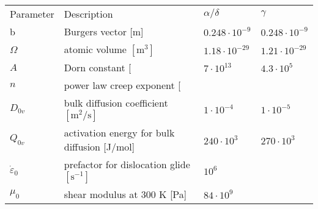 \documentclass[letterpaper,10pt,english]{jupyterBook}
\begin{document}
	
	\begin{savenotes}\sphinxattablestart
		\sphinxthistablewithglobalstyle
		\centering
		\begin{tabulary}{\linewidth}[t]{TTTT}
			\sphinxtoprule
			\sphinxstyletheadfamily 
			\sphinxAtStartPar
			Parameter
			&\sphinxstyletheadfamily 
			\sphinxAtStartPar
			Description
			&\sphinxstyletheadfamily 
			\sphinxAtStartPar
			\(\alpha/\delta\)
			&\sphinxstyletheadfamily 
			\sphinxAtStartPar
			\(\gamma\)
			\\
			\sphinxmidrule
			\sphinxtableatstartofbodyhook
			\sphinxAtStartPar
			b
			&
			\sphinxAtStartPar
			Burgers vector {[}m{]}
			&
			\sphinxAtStartPar
			\(0.248\cdot 10^{-9}\)
			&
			\sphinxAtStartPar
			\(0.248\cdot 10^{-9}\)
			\\
			\sphinxhline
			\sphinxAtStartPar
			\(\Omega\)
			&
			\sphinxAtStartPar
			atomic volume \(\left[\mathrm{m}^3\right]\)
			&
			\sphinxAtStartPar
			\(1.18\cdot 10^{-29}\)
			&
			\sphinxAtStartPar
			\(1.21\cdot 10^{-29}\)
			\\
			\sphinxhline
			\sphinxAtStartPar
			\(A\)
			&
			\sphinxAtStartPar
			Dorn constant {[}\sphinxhyphen{}{]}
			&
			\sphinxAtStartPar
			\(7 \cdot 10^{13}\)
			&
			\sphinxAtStartPar
			\(4.3\cdot 10^{5}\)
			\\
			\sphinxhline
			\sphinxAtStartPar
			\(n\)
			&
			\sphinxAtStartPar
			power law creep exponent {[}\sphinxhyphen{}{]}
			&
			&
			\\
			\sphinxhline
			\sphinxAtStartPar
			\(D_{0v}\)
			&
			\sphinxAtStartPar
			bulk diffusion coefficient \(\left[\mathrm{m}^2/\mathrm{s}\right]\)
			&
			\sphinxAtStartPar
			\(1 \cdot 10^{-4}\)
			&
			\sphinxAtStartPar
			\(1 \cdot 10^{-5}\)
			\\
			\sphinxhline
			\sphinxAtStartPar
			\(Q_{0v}\)
			&
			\sphinxAtStartPar
			activation energy for bulk diffusion {[}J/mol{]}
			&
			\sphinxAtStartPar
			\(240 \cdot 10^{3}\)
			&
			\sphinxAtStartPar
			\(270 \cdot 10^{3}\)
			\\
			\sphinxhline
			\sphinxAtStartPar
			\(\dot{\varepsilon}_{0}\)
			&
			\sphinxAtStartPar
			prefactor for dislocation glide \(\left[\mathrm{s}^{-1}\right]\)
			&
			\sphinxAtStartPar
			\(10^{6}\)
			&
			\sphinxAtStartPar
			\sphinxhyphen{}
			\\
			\sphinxhline
			\sphinxAtStartPar
			\(\mu_{0}\)
			&
			\sphinxAtStartPar
			shear modulus at 300 K {[}Pa{]}
			&
			\sphinxAtStartPar
			\(84 \cdot 10^{9}\)
			&

\end{tabulary}
\end{savenotes}
\end{document}

